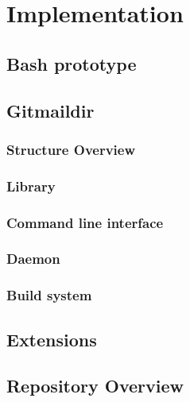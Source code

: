\chapter{Implementation}

\section{Bash prototype}

\section{Gitmaildir}

\subsection{Structure Overview}

\subsection{Library}

\subsection{Command line interface}

\subsection{Daemon}

\subsection{Build system}

\section{Extensions}

\section{Repository Overview}
